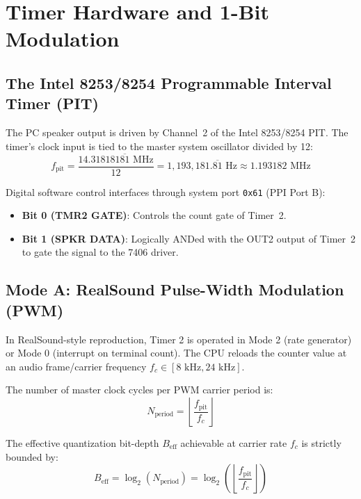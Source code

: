 \documentclass[11pt,a4paper]{article}
\begin{document}
\section{Timer Hardware and 1-Bit Modulation}

\subsection{The Intel 8253/8254 Programmable Interval Timer (PIT)}
The PC speaker output is driven by Channel~2 of the Intel 8253/8254 PIT. The timer's clock input is tied to the master system oscillator divided by 12:
\begin{equation}
f_{\text{pit}} = \frac{14.318181\overline{81}\text{ MHz}}{12} = 1,193,181.\overline{81}\text{ Hz} \approx 1.193182\text{ MHz}
\end{equation}

Digital software control interfaces through system port \texttt{0x61} (PPI Port B):
\begin{itemize}
    \item \textbf{Bit 0 (TMR2 GATE)}: Controls the count gate of Timer~2.
    \item \textbf{Bit 1 (SPKR DATA)}: Logically ANDed with the OUT2 output of Timer~2 to gate the signal to the 7406 driver.
\end{itemize}

\subsection{Mode A: RealSound Pulse-Width Modulation (PWM)}
In RealSound-style reproduction, Timer 2 is operated in Mode 2 (rate generator) or Mode 0 (interrupt on terminal count). The CPU reloads the counter value at an audio frame/carrier frequency $f_c \in [8\text{ kHz}, 24\text{ kHz}]$.

The number of master clock cycles per PWM carrier period is:
\begin{equation}
N_{\text{period}} = \left\lfloor \frac{f_{\text{pit}}}{f_c} \right\rfloor
\end{equation}

The effective quantization bit-depth $B_{\text{eff}}$ achievable at carrier rate $f_c$ is strictly bounded by:
\begin{equation}
B_{\text{eff}} = \log_2(N_{\text{period}}) = \log_2\left( \left\lfloor \frac{f_{\text{pit}}}{f_c} \right\rfloor \right)
\end{equation}
\end{document}
